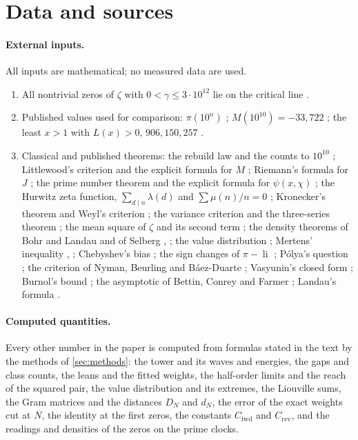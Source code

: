 \documentclass[11pt]{article}
\theoremstyle{definition}\newtheorem{definition}[theorem]{Definition}
\theoremstyle{remark}\newtheorem{remark}[theorem]{Remark}
\theoremstyle{definition}\newtheorem{axiom}{Axiom}
\newcommand{\li}{\operatorname{li}}\newcommand{\Tr}{\operatorname{Tr}}
\begin{document}
\section{Data and sources}\label{sec:data}
\paragraph{External inputs.} All inputs are mathematical; no measured data are used.
\begin{enumerate}[label=(\roman*)]
\item All nontrivial zeros of $\zeta$ with $0<\gamma\le3\cdot10^{12}$ lie on the critical line \cite{PT}.
\item Published values used for comparison: $\pi(10^n)$ \cite{OEISpi}; $M(10^{10})=-33{,}722$ \cite{OEISM}; the least $x>1$ with $L(x)>0$, $906{,}150{,}257$ \cite{Tanaka}.
\item Classical and published theorems: the rebuild law and the counts to $10^{10}$ \cite{S10}; Littlewood's criterion and the explicit formula for $M$ \cite[Theorems 14.25(C), 14.27]{Titchmarsh}; Riemann's formula for $J$ \cite{Riemann,vonMangoldt}; the prime number theorem and the explicit formula for $\psi(x,\chi)$ \cite[Ch.~18, 19]{Davenport}; the Hurwitz zeta function, $\sum_{d\mid n}\lambda(d)$ and $\sum\mu(n)/n=0$ \cite{Apostol}; Kronecker's theorem and Weyl's criterion \cite{HardyWright,Weyl}; the variance criterion and the three-series theorem \cite{KhintchineKolmogoroff,Durrett}; the mean square of $\zeta$ \cite[Theorem 7.2]{Titchmarsh} and its second term \cite{Matsumoto}; the density theorems of Bohr and Landau and of Selberg \cite{BohrLandau,Selberg46}, \cite[Theorems 9.15(A), 9.19(C)]{Titchmarsh}; the value distribution \cite{BohrJessen1,BohrJessen2}; Mertens' inequality \cite{Mertens}, \cite[\S3.3, (3.3.1)]{Titchmarsh}; Chebyshev's bias \cite{RubinsteinSarnak}; the sign changes of $\pi-\li$ \cite{Littlewood14}; Pólya's question \cite{Polya}; the criterion of Nyman, Beurling and Báez-Duarte \cite{Nyman,Beurling,BaezDuarte}; Vasyunin's closed form \cite{Vasyunin}; Burnol's bound \cite{Burnol}; the asymptotic of Bettin, Conrey and Farmer \cite{BCF}; Landau's formula \cite{Landau12,Gonek}.
\end{enumerate}
\paragraph{Computed quantities.} Every other number in the paper is computed from formulas stated in the text by the methods of \cref{sec:methods}: the tower and its waves and energies, the gaps and class counts, the leans and the fitted weights, the half-order limits and the reach of the squared pair, the value distribution and its extremes, the Liouville sums, the Gram matrices and the distances $D_N$ and $d_N$, the error of the exact weights cut at $N$, the identity at the first zeros, the constants $C_{\mathrm{fwd}}$ and $C_{\mathrm{rev}}$, and the readings and densities of the zeros on the prime clocks.
\end{document}
